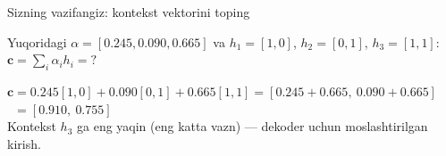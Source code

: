 \documentclass[aspectratio=169,11pt]{beamer}
\begin{document}
\begin{frame}{Sizning vazifangiz: kontekst vektorini toping}
  \begin{tcolorbox}[warnbox,title=Savol --- 90 soniya]
    \small
    Yuqoridagi $\alpha=[0.245, 0.090, 0.665]$ va $h_1=[1,0]$, $h_2=[0,1]$,
    $h_3=[1,1]$:\\[4pt]
    \textbf{\large $\mathbf{c} = \sum_i \alpha_i h_i = ?$}
  \end{tcolorbox}
  \pause
  \begin{tcolorbox}[okbox,title=Javob]
    \small
    $\mathbf{c} = 0.245[1,0] + 0.090[0,1] + 0.665[1,1]
       = [0.245{+}0.665,\ 0.090{+}0.665]$\\[3pt]
    $\phantom{\mathbf{c}} = \mathbf{[0.910,\ 0.755]}$\\[3pt]
    \footnotesize Kontekst $h_3$ ga eng yaqin (eng katta vazn) --- dekoder uchun
    moslashtirilgan kirish.
  \end{tcolorbox}
\end{frame}
\end{document}
